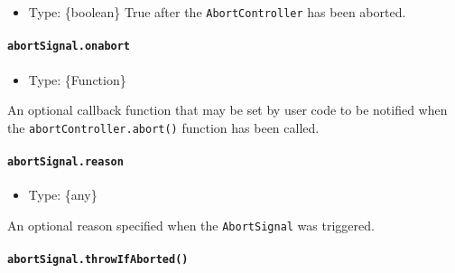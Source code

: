 \begin{itemize}
\tightlist
\item
  Type: \{boolean\} True after the \texttt{AbortController} has been
  aborted.
\end{itemize}

\paragraph{\texorpdfstring{\texttt{abortSignal.onabort}}{abortSignal.onabort}}\label{abortsignal.onabort}

\begin{itemize}
\tightlist
\item
  Type: \{Function\}
\end{itemize}

An optional callback function that may be set by user code to be
notified when the \texttt{abortController.abort()} function has been
called.

\paragraph{\texorpdfstring{\texttt{abortSignal.reason}}{abortSignal.reason}}\label{abortsignal.reason}

\begin{itemize}
\tightlist
\item
  Type: \{any\}
\end{itemize}

An optional reason specified when the \texttt{AbortSignal} was
triggered.

\begin{Shaded}
\begin{Highlighting}[]
\OperatorTok{=}  \NormalTok{()}\OperatorTok{;}
\NormalTok{(} \NormalTok{(}\NormalTok{))}\OperatorTok{;}
\NormalTok{)}\OperatorTok{;}  
\end{Highlighting}
\end{Shaded}

\paragraph{\texorpdfstring{\texttt{abortSignal.throwIfAborted()}}{abortSignal.throwIfAborted()}}\label{abortsignal.throwifaborted}

